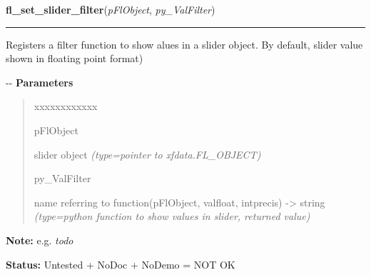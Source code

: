 \hspace{.8\funcindent}\begin{boxedminipage}{\funcwidth}

    \raggedright \textbf{fl\_set\_slider\_filter}(\textit{pFlObject}, \textit{py\_ValFilter})

    \vspace{-1.5ex}

    \rule{\textwidth}{0.5\fboxrule}
\setlength{\parskip}{2ex}

Registers a filter function to show alues in a slider object. By
default, slider value shown in floating point format)

-{}-
\setlength{\parskip}{1ex}
      \textbf{Parameters}
      \vspace{-1ex}

      \begin{quote}
        \begin{Ventry}{xxxxxxxxxxxx}

          \item[pFlObject]


slider object
            {\it (type=pointer to xfdata.FL\_OBJECT)}

          \item[py\_ValFilter]


name referring to function(pFlObject, valfloat, intprecis) -> string
            {\it (type=python function to show values in slider, returned value)}

        \end{Ventry}

      \end{quote}

\textbf{Note:} 
e.g. \emph{todo}


\textbf{Status:} 
Untested + NoDoc + NoDemo = NOT OK


    \end{boxedminipage}

